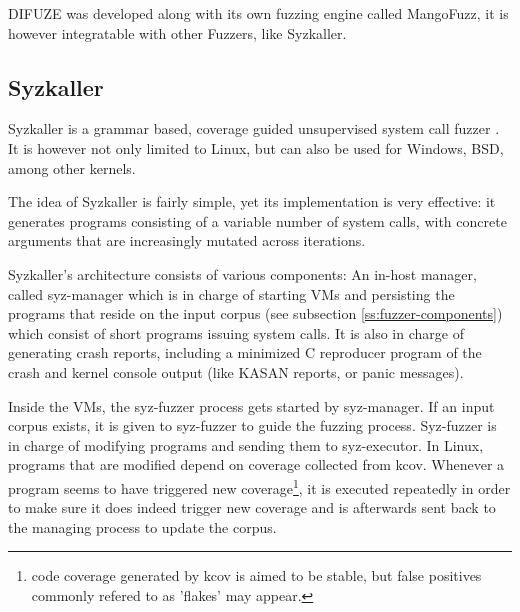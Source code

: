 DIFUZE was developed along with its own fuzzing engine called MangoFuzz, it is however integratable with other Fuzzers, like Syzkaller.



\subsection{Syzkaller}\label{ss:syzkaller}

Syzkaller is a grammar based, coverage guided unsupervised
system call fuzzer \cite{GoogleSyzkaller2021}. It is however not only
limited to Linux, but can also be used for Windows, BSD, among other
kernels.

The idea of Syzkaller is fairly simple, yet its implementation is very effective: it generates
programs consisting of a variable number of system calls, with
concrete arguments that are increasingly mutated across iterations.


Syzkaller's architecture consists of various components: An in-host manager, called
syz-manager which is in charge of starting VMs and persisting the programs that
reside on the input corpus (see subsection \ref{ss:fuzzer-components}) which consist of short programs issuing
system calls. It is also in charge of generating crash reports, including a minimized C reproducer program of the crash and kernel console output (like KASAN reports, or panic
messages).

Inside the VMs, the syz-fuzzer process gets started by syz-manager. If an input
corpus exists, it is given to syz-fuzzer to guide the fuzzing process. Syz-fuzzer is
in charge of modifying programs and sending them to syz-executor. In Linux, programs that
are modified depend on coverage collected from kcov. Whenever a program seems to have triggered new coverage\footnote{code coverage generated by kcov is aimed to be stable, but false positives commonly refered to as 'flakes' may appear.},
it is executed repeatedly in order to make sure it does indeed trigger new coverage and is
afterwards sent back to the managing process to update the corpus.

